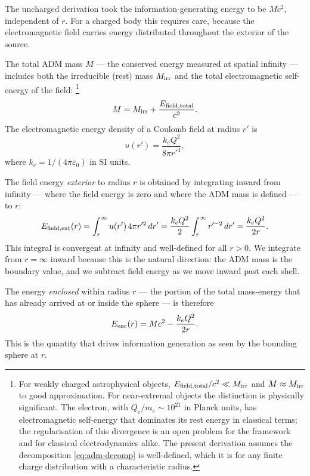 \documentclass[12pt]{article}
\begin{document}
The uncharged derivation took the information-generating energy to be
$Mc^2$, independent of $r$.
For a charged body this requires care, because the electromagnetic
field carries energy distributed throughout the exterior of the source.

The total ADM mass $M$ --- the conserved energy measured at spatial
infinity --- includes both the irreducible (rest) mass $M_{\rm irr}$
and the total electromagnetic self-energy of the field:%
\footnote{For weakly charged astrophysical objects,
$E_{\rm field,total}/c^2 \ll M_{\rm irr}$ and $M \approx M_{\rm irr}$
to good approximation.
For near-extremal objects the distinction is physically significant.
The electron, with $Q_e/m_e \sim 10^{21}$ in Planck units, has
electromagnetic self-energy that dominates its rest energy in classical
terms; the regularisation of this divergence is an open problem for
the framework and for classical electrodynamics alike.
The present derivation assumes the decomposition
\eqref{eq:adm-decomp} is well-defined, which it is for any finite
charge distribution with a characteristic radius.}
\begin{equation}
  M = M_{\rm irr} + \frac{E_{\rm field,total}}{c^2}.
  \label{eq:adm-decomp}
\end{equation}
The electromagnetic energy density of a Coulomb field at radius $r'$ is
\begin{equation}
  u(r') = \frac{k_e Q^2}{8\pi r'^4},
  \label{eq:em-density}
\end{equation}
where $k_e = 1/(4\pi\varepsilon_0)$ in SI units.

The field energy \emph{exterior} to radius $r$ is obtained by
integrating inward from infinity --- where the field energy is zero
and where the ADM mass is defined --- to $r$:
\begin{equation}
  E_{\rm field,ext}(r)
    = \int_r^\infty u(r')\,4\pi r'^2\,dr'
    = \frac{k_e Q^2}{2}\int_r^\infty r'^{-2}\,dr'
    = \frac{k_e Q^2}{2r}.
  \label{eq:field-ext}
\end{equation}
This integral is convergent at infinity and well-defined for all
$r > 0$.
We integrate from $r = \infty$ inward because this is the natural
direction: the ADM mass is the boundary value, and we subtract field
energy as we move inward past each shell.

The energy \emph{enclosed} within radius $r$ --- the portion of the
total mass-energy that has already arrived at or inside the sphere ---
is therefore
\begin{equation}
  E_{\rm enc}(r) = Mc^2 - \frac{k_e Q^2}{2r}.
  \label{eq:e-enc}
\end{equation}
This is the quantity that drives information generation as seen by the
bounding sphere at $r$.
\end{document}
